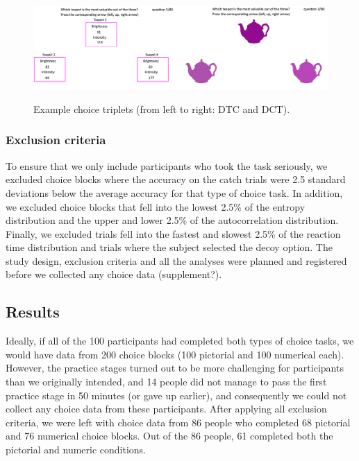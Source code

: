 \documentclass[11pt,a4paper]{article}
\begin{document}
\begin{figure}
\centering
\caption{Example choice triplets (from left to right: DTC and DCT).}
\includegraphics[width=1\textwidth]{choice_triplets.png}
\label{fig:choicetriplets}
\end{figure}


\subsubsection{Exclusion criteria}

To ensure that we only include participants who took the task seriously, we excluded choice blocks where the accuracy on the catch trials were 2.5 standard deviations below the average accuracy for that type of choice task. In addition, we excluded choice blocks that fell into the lowest 2.5\% of the entropy distribution
and the upper and lower 2.5\% of the autocorrelation distribution. Finally, we excluded trials fell into the fastest and slowest 2.5\% of
the reaction time distribution and trials where the subject selected the decoy option.
The study design, exclusion criteria and all the analyses were planned and
registered before we collected any choice data (supplement?).

\subsection{Results}

Ideally, if all of the 100 participants had completed both types of choice tasks, we would have data from 200 choice blocks (100 pictorial and 100 numerical each). However, the practice stages turned out to be more challenging for participants than we originally intended, and 14 people did not manage to pass the first practice stage in 50 minutes (or gave up earlier), and consequently we could not collect any choice data from these participants. After applying all exclusion criteria, we were left with choice data from 86 people who completed 68 pictorial and 76 numerical choice blocks. Out of the 86 people, 61 completed both the pictorial and numeric conditions.
\end{document}

